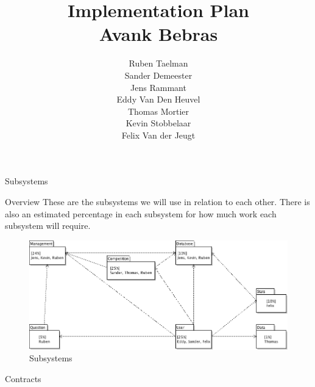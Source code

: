 \documentclass[10pt,a4paper]{article}
\author{
    Ruben Taelman \\
    Sander Demeester \\
    Jens Rammant \\
    Eddy Van Den Heuvel \\
    Thomas Mortier \\
    Kevin Stobbelaar \\
    Felix Van der Jeugt
}
\title{
    Implementation Plan \\
    Avank Bebras
}
\begin{document}
\begin{section}{Subsystems}
	\begin{subsection}{Overview}
		These are the subsystems we will use in relation to each other. There is also an
		estimated percentage in each subsystem for how much work each subsystem will
		require.
		\begin{figure}[!h]
		  \centering
			\includegraphics[width=1\textwidth]{../class_diagrams/subsystems.png}
		  \caption{Subsystems}
		  \label{subsystems}
		\end{figure}
	\end{subsection}
	
	\begin{subsection}{Contracts}
		
		
		
		
        	
		
        	
		
	\end{subsection}
	
	
	
	
	
	
	
	
\end{section}	
\end{document}
